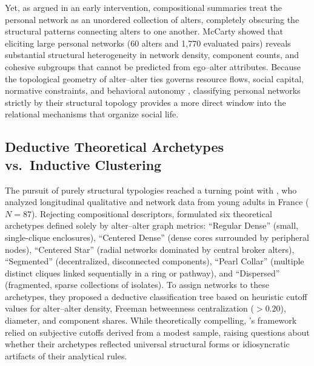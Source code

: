 \documentclass[12pt]{article}
\begin{document}
Yet, as \citet{mccarty2002structure} argued in an early intervention, compositional summaries treat the personal network as an unordered collection of alters, completely obscuring the structural patterns connecting alters to one another. McCarty showed that eliciting large personal networks (60 alters and 1,770 evaluated pairs) reveals substantial structural heterogeneity in network density, component counts, and cohesive subgroups that cannot be predicted from ego--alter attributes. Because the topological geometry of alter--alter ties governs resource flows, social capital, normative constraints, and behavioral autonomy \citep{burt1992structural, coleman1988social, granovetter1973strength}, classifying personal networks strictly by their structural topology provides a more direct window into the relational mechanisms that organize social life.

\subsection{Deductive Theoretical Archetypes vs.\ Inductive Clustering}

The pursuit of purely structural typologies reached a turning point with \citet{bidart2018personal}, who analyzed longitudinal qualitative and network data from young adults in France ($N = 87$). Rejecting compositional descriptors, \citeauthor{bidart2018personal} formulated six theoretical archetypes defined solely by alter--alter graph metrics: ``Regular Dense'' (small, single-clique enclosures), ``Centered Dense'' (dense cores surrounded by peripheral nodes), ``Centered Star'' (radial networks dominated by central broker alters), ``Segmented'' (decentralized, disconnected components), ``Pearl Collar'' (multiple distinct cliques linked sequentially in a ring or pathway), and ``Dispersed'' (fragmented, sparse collections of isolates). To assign networks to these archetypes, they proposed a deductive classification tree based on heuristic cutoff values for alter--alter density, Freeman betweenness centralization ($> 0.20$), diameter, and component shares. While theoretically compelling, \citeauthor{bidart2018personal}'s framework relied on subjective cutoffs derived from a modest sample, raising questions about whether their archetypes reflected universal structural forms or idiosyncratic artifacts of their analytical rules.
\end{document}
